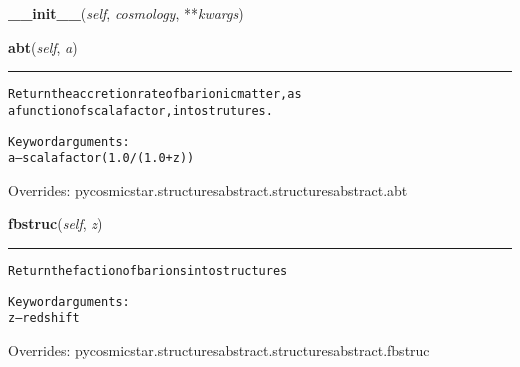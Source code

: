     \label{pycosmicstar:structures:structures:__init__}

    \vspace{0.5ex}

\hspace{.8\funcindent}\begin{boxedminipage}{\funcwidth}

    \raggedright \textbf{\_\_init\_\_}(\textit{self}, \textit{cosmology}, **\textit{kwargs})

\setlength{\parskip}{2ex}
\setlength{\parskip}{1ex}
    \end{boxedminipage}

    \vspace{0.5ex}

\hspace{.8\funcindent}\begin{boxedminipage}{\funcwidth}

    \raggedright \textbf{abt}(\textit{self}, \textit{a})

    \vspace{-1.5ex}

    \rule{\textwidth}{0.5\fboxrule}
\setlength{\parskip}{2ex}
\begin{alltt}
Return the accretion rate of barionic matter, as
a function of scala factor, into strutures.

Keyword arguments:
    a -- scala factor (1.0 / (1.0 + z))
\end{alltt}

\setlength{\parskip}{1ex}
      Overrides: pycosmicstar.structuresabstract.structuresabstract.abt

    \end{boxedminipage}

    \vspace{0.5ex}

\hspace{.8\funcindent}\begin{boxedminipage}{\funcwidth}

    \raggedright \textbf{fbstruc}(\textit{self}, \textit{z})

    \vspace{-1.5ex}

    \rule{\textwidth}{0.5\fboxrule}
\setlength{\parskip}{2ex}
\begin{alltt}
Return the faction of barions into structures

Keyword arguments:
    z -- redshift
\end{alltt}

\setlength{\parskip}{1ex}
      Overrides: pycosmicstar.structuresabstract.structuresabstract.fbstruc

    \end{boxedminipage}

